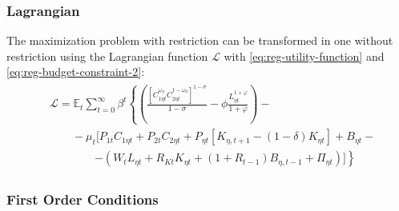 \documentclass[
thesis.tex
]{subfiles}
\begin{document}
\subsubsection*{Lagrangian}

The maximization problem with restriction can be transformed in one without restriction using the Lagrangian function $\mathcal{L}$ with \ref{eq:reg-utility-function} and \ref{eq:reg-budget-constraint-2}:
\begin{align}
	\begin{split}
	& \mathcal{L} = \mathbb{E}_t \sum_{t=0}^{\infty} \beta^t \left\{ \left( \frac{ \left[ C_{1\eta t}^{\omega_{\eta}} C_{2\eta t}^{1-\omega_{\eta}} \right]^{1 -\sigma}}{1 -\sigma} - \phi \frac{L_{\eta t}^{1+\varphi}}{1+\varphi} \right) \right. - \\ & \qquad - \mu_t \Big[ P_{1t} C_{1\eta t} + P_{2t} C_{2\eta t} + P_{\eta t} [ K_{\eta, t+1} - (1-\delta)K_{\eta t} ] + B_{\eta t} - \\ & \qquad \qquad \left. - ( W_t L_{\eta t} + R_{Kt} K_{\eta t} + (1 + R_{t-1}) B_{\eta,t-1} + \Pi_{\eta t} ) \Big] \right\} \label{eq:reg-household-lagrangian}
	\end{split}
\end{align}

\subsubsection*{First Order Conditions}
\end{document}
